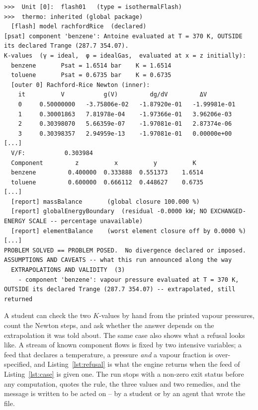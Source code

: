 \documentclass[11pt,a4paper]{article}
\begin{document}
\begin{lstlisting}[caption={Excerpt of the run log of the flash
  (\texttt{verbosity 3}); elided lines marked \texttt{[...]}.},label=lst:log,
  breaklines=true, breakindent=0pt]
>>>  Unit [0]:  flash01   (type = isothermalFlash)
>>>  thermo: inherited (global package)
  [flash] model rachfordRice  (declared)
[psat] component 'benzene': Antoine evaluated at T = 370 K, OUTSIDE its declared Trange (287.7 354.07).
K-values  (γ = ideal,  φ = idealGas,  evaluated at x = z initially):
  benzene       Psat = 1.6514 bar    K = 1.6514
  toluene       Psat = 0.6735 bar    K = 0.6735
  [outer 0] Rachford-Rice Newton (inner):
    it          V           g(V)         dg/dV         ΔV
    0     0.50000000   -3.75806e-02   -1.87920e-01   -1.99981e-01
    1     0.30001863   7.81978e-04    -1.97366e-01   3.96206e-03
    2     0.30398070   5.66359e-07    -1.97081e-01   2.87374e-06
    3     0.30398357   2.94959e-13    -1.97081e-01   0.00000e+00
[...]
  V/F:           0.303984
  Component         z          x          y          K
  benzene         0.400000  0.333888  0.551373    1.6514
  toluene         0.600000  0.666112  0.448627    0.6735
[...]
  [report] massBalance       (global closure 100.000 %)
  [report] globalEnergyBoundary  (residual -0.0000 kW; NO EXCHANGED-ENERGY SCALE -- percentage unavailable)
  [report] elementBalance    (worst element closure off by 0.0000 %)
[...]
PROBLEM SOLVED == PROBLEM POSED.  No divergence declared or imposed.
ASSUMPTIONS AND CAVEATS -- what this run announced along the way
  EXTRAPOLATIONS AND VALIDITY  (3)
    - component 'benzene': vapour pressure evaluated at T = 370 K, OUTSIDE its declared Trange (287.7 354.07) -- extrapolated, still returned
\end{lstlisting}

A student can check the two $K$-values by hand from the printed vapour
pressures, count the Newton steps, and ask whether the answer depends on
the extrapolation it was told about.  The same case also shows what a
refusal looks like.  A stream of known component flows is fixed by two
intensive variables; a feed that declares a temperature, a pressure
\emph{and} a vapour fraction is over-specified, and Listing~\ref{lst:refusal}
is what the engine returns when the feed of Listing~\ref{lst:case} is
given one.  The run stops with a non-zero exit status before any
computation, quotes the rule, the three values and two remedies, and the
message is written to be acted on -- by a student or by an agent that wrote
the file.
\end{document}
